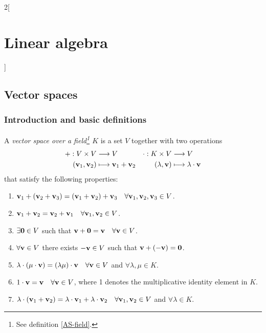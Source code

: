 \documentclass[../../../main.tex]{subfiles}
\begin{document}
\begin{multicols}{2}[\section{Linear algebra}]
    \subsection{Vector spaces}
    \subsubsection*{Introduction and basic definitions}
    \begin{definition}
        A \textit{vector space over a field\footnote{See definition \ref{AS-field}.} $K$} is a set $V$ together with two operations
        \begin{align*}
            +:V\times V                                 & \longrightarrow V                                      & \cdot:K\times V              & \longrightarrow V                           \\
            (\boldsymbol{\mathrm{v}}_1,\boldsymbol{\mathrm{v}}_2) & \longmapsto \boldsymbol{\mathrm{v}}_1+ \boldsymbol{\mathrm{v}}_2 & (\lambda,\boldsymbol{\mathrm{v}}) & \longmapsto \lambda\cdot \boldsymbol{\mathrm{v}}
        \end{align*}
        that satisfy the following properties:
        \begin{enumerate}
            \item $\boldsymbol{\mathrm{v}}_1+(\boldsymbol{\mathrm{v}}_2+\boldsymbol{\mathrm{v}}_3)=(\boldsymbol{\mathrm{v}}_1+\boldsymbol{\mathrm{v}}_2)+\boldsymbol{\mathrm{v}}_3\quad\forall\boldsymbol{\mathrm{v}}_1,\boldsymbol{\mathrm{v}}_2,\boldsymbol{\mathrm{v}}_3\in V$.
            \item $\boldsymbol{\mathrm{v}}_1+\boldsymbol{\mathrm{v}}_2=\boldsymbol{\mathrm{v}}_2+\boldsymbol{\mathrm{v}}_1\quad\forall\boldsymbol{\mathrm{v}}_1,\boldsymbol{\mathrm{v}}_2\in V$.
            \item $\exists\boldsymbol{\mathrm{0}}\in V$ such that $\boldsymbol{\mathrm{v}}+\boldsymbol{\mathrm{0}}=\boldsymbol{\mathrm{v}}\quad\forall\boldsymbol{\mathrm{v}}\in V$.
            \item $\forall\boldsymbol{\mathrm{v}}\in V$ there exists $-\boldsymbol{\mathrm{v}}\in V$ such that $\boldsymbol{\mathrm{v}}+(-\boldsymbol{\mathrm{v}})=\boldsymbol{\mathrm{0}}$.
            \item $\lambda\cdot(\mu\cdot\boldsymbol{\mathrm{v}})=(\lambda\mu)\cdot\boldsymbol{\mathrm{v}}\quad\forall\boldsymbol{\mathrm{v}}\in V$ and $\forall\lambda,\mu\in K$.
            \item $1\cdot\boldsymbol{\mathrm{v}}=\boldsymbol{\mathrm{v}}\quad\forall\boldsymbol{\mathrm{v}}\in V$, where 1 denotes the multiplicative identity element in $K$.
            \item $\lambda\cdot(\boldsymbol{\mathrm{v}}_1+\boldsymbol{\mathrm{v}}_2)=\lambda\cdot\boldsymbol{\mathrm{v}}_1+\lambda\cdot\boldsymbol{\mathrm{v}}_2\quad\forall\boldsymbol{\mathrm{v}}_1,\boldsymbol{\mathrm{v}}_2\in V$ and $\forall\lambda\in K$.

\end{enumerate}
\end{definition}
\end{multicols}
\end{document}
